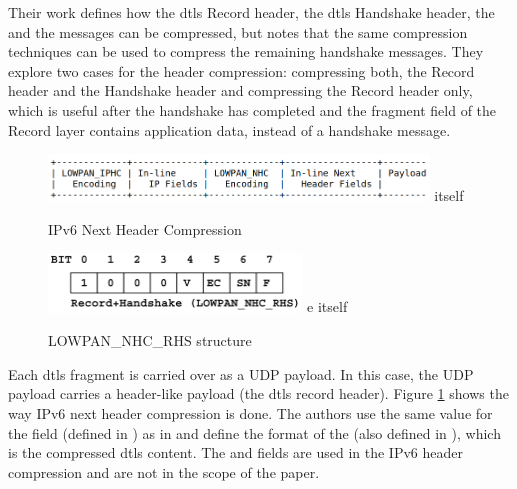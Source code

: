 \documentclass{llncs}
\begin{document}
Their work defines how the \gls{dtls} Record header, the \gls{dtls} Handshake header,
the  and the  messages can be compressed, but notes that
the same compression techniques can be used to compress the remaining handshake
messages. They explore two cases for the header compression: compressing both,
the Record header and the Handshake header and compressing the Record header only,
which is useful after the handshake has completed and the fragment field of the
Record layer contains application data, instead of a handshake message.

\begin{figure}
  \centering
  \includegraphics[width=0.9\textwidth]{img/6lowpan-header.png} %
  itself
\caption{\label{fig:6lowpan-header} IPv6 Next Header Compression}
\end{figure}

\begin{figure}
  \centering
  \includegraphics[width=0.6\textwidth]{img/6lowpan-ghc-rhs.png} %
  e itself
  \caption{\label{fig:6lowpan-ghc-rhs} LOWPAN\_NHC\_RHS structure}
\end{figure}


Each \gls{dtls} fragment is carried over as a UDP payload. In this case,
the UDP payload carries a header-like payload (the \gls{dtls} record header).
Figure \ref{fig:6lowpan-header} shows the way IPv6 next header compression is done.
The authors use the same value for the  field (defined in \cite{RFC6282})
as in  and define the format of the 
(also defined in \cite{RFC6282}), which is the compressed \gls{dtls} content. The 
and  fields are used in the IPv6 header compression
and are not in the scope of the paper.
\end{document}
